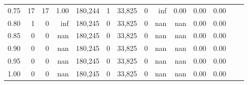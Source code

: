 \begin{tabular}{rrrrrrrrrrrrrr}
0.75 &      17 &     17 &    1.00 &  180,244 &        1 &  33,825 &       0 &   inf &  0.00 &  0.00 &      0.00 \\
0.80 &       1 &      0 &     inf &  180,245 &        0 &  33,825 &       0 &   nan &   nan &  0.00 &      0.00 \\
0.85 &       0 &      0 &     nan &  180,245 &        0 &  33,825 &       0 &   nan &   nan &  0.00 &      0.00 \\
0.90 &       0 &      0 &     nan &  180,245 &        0 &  33,825 &       0 &   nan &   nan &  0.00 &      0.00 \\
0.95 &       0 &      0 &     nan &  180,245 &        0 &  33,825 &       0 &   nan &   nan &  0.00 &      0.00 \\
1.00 &       0 &      0 &     nan &  180,245 &        0 &  33,825 &       0 &   nan &   nan &  0.00 &      0.00 \\
\bottomrule
\end{tabular}
